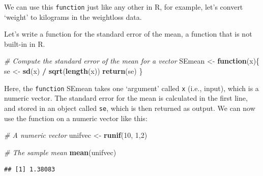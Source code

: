 \documentclass[]{book}
\newenvironment{Shaded}{\begin{snugshade}}{\end{snugshade}}
\newcommand{\CommentTok}[1]{\textcolor[rgb]{0.56,0.35,0.01}{\textit{#1}}}
\newcommand{\ControlFlowTok}[1]{\textcolor[rgb]{0.13,0.29,0.53}{\textbf{#1}}}
\newcommand{\DecValTok}[1]{\textcolor[rgb]{0.00,0.00,0.81}{#1}}
\newcommand{\KeywordTok}[1]{\textcolor[rgb]{0.13,0.29,0.53}{\textbf{#1}}}
\newcommand{\NormalTok}[1]{#1}
\newcommand{\OperatorTok}[1]{\textcolor[rgb]{0.81,0.36,0.00}{\textbf{#1}}}
\newcommand{\StringTok}[1]{\textcolor[rgb]{0.31,0.60,0.02}{#1}}
\begin{document}
We can use this \texttt{function} just like any other in R, for example, let's convert `weight' to kilograms in the weightloss data.

\begin{Shaded}
\end{Shaded}

Let's write a function for the standard error of the mean, a function that is not built-in in R.

\begin{Shaded}
\begin{Highlighting}[]
\CommentTok{# Compute the standard error of the mean for a vector}
\NormalTok{SEmean <-}\StringTok{ }\ControlFlowTok{function}\NormalTok{(x)\{}
\NormalTok{  se <-}\StringTok{ }\KeywordTok{sd}\NormalTok{(x) }\OperatorTok{/}\StringTok{ }\KeywordTok{sqrt}\NormalTok{(}\KeywordTok{length}\NormalTok{(x))}
  \KeywordTok{return}\NormalTok{(se)}
\NormalTok{\}}
\end{Highlighting}
\end{Shaded}

Here, the \texttt{function} SEmean takes one `argument' called \texttt{x} (i.e., input), which is a numeric vector. The standard error for the mean is calculated in the first line, and stored in an object called \texttt{se}, which is then returned as output. We can now use the function on a numeric vector like this:

\begin{Shaded}
\begin{Highlighting}[]
\CommentTok{# A numeric vector}
\NormalTok{unifvec <-}\StringTok{ }\KeywordTok{runif}\NormalTok{(}\DecValTok{10}\NormalTok{, }\DecValTok{1}\NormalTok{,}\DecValTok{2}\NormalTok{)}

\CommentTok{# The sample mean}
\KeywordTok{mean}\NormalTok{(unifvec)}
\end{Highlighting}
\end{Shaded}

\begin{verbatim}
## [1] 1.38083
\end{verbatim}
\end{document}
